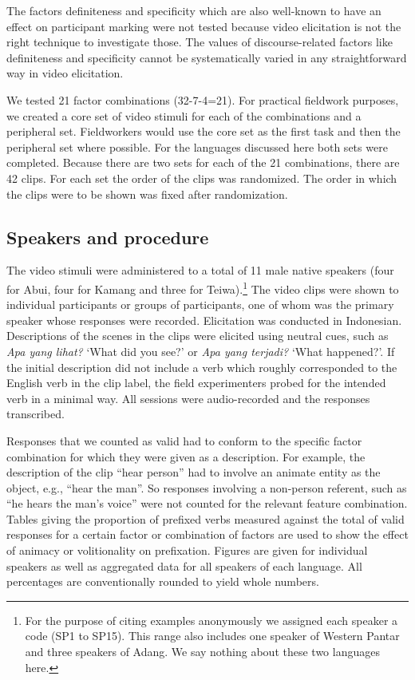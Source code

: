   The factors definiteness and specificity which are also well-known to have an effect on participant marking \citep{Aissen2003} were not tested because video elicitation is not the right technique to investigate those. The values of discourse-related factors like definiteness and specificity cannot be systematically varied in any straightforward way in video elicitation.

We tested 21 factor combinations (32-7-4=21). For practical fieldwork purposes, we created a core set of video stimuli for each of the combinations and a peripheral set. Fieldworkers would use the core set as the first task and then the peripheral set where possible. For the languages discussed here both sets were completed. Because there are two sets for each of the 21 combinations, there are 42 clips. For each set the order of the clips was randomized. The order in which the clips were to be shown was fixed after randomization. 

\subsection{Speakers and procedure}
\label{sec:10:4.2}
The video stimuli were administered to a total of 11 male native speakers (four for Abui, four for Kamang and three for Teiwa).\footnote{For the purpose of citing examples anonymously we assigned each speaker a code (SP1 to SP15). This range also includes one speaker of Western Pantar and three speakers of Adang. We say nothing about these two languages here.} The video clips were shown to individual participants or groups of participants, one of whom was the primary speaker whose responses were recorded. Elicitation was conducted in Indonesian. Descriptions of the scenes in the clips were elicited using neutral cues, such as \textit{Apa yang lihat?} `What did you see?' or \textit{Apa yang terjadi?} `What happened?'. If the initial description did not include a verb which roughly corresponded to the English verb in the clip label, the field experimenters probed for the intended verb in a minimal way. All sessions were audio-recorded and the responses transcribed.

  Responses that we counted as valid had to conform to the specific factor combination for which they were given as a description. For example, the description of the clip ``hear person'' had to involve an animate entity as the object, e.g., ``hear the man''. So responses involving a non-person referent, such as ``he hears the man's voice'' were not counted for the relevant feature combination. Tables giving the proportion of prefixed verbs measured against the total of valid responses for a certain factor or combination of factors are used to show the effect of animacy or volitionality on prefixation. Figures are given for individual speakers as well as aggregated data for all speakers of each language. All percentages are conventionally rounded to yield whole numbers.

